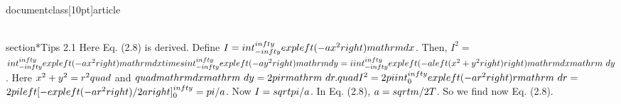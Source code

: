 \\documentclass[10pt]{article}
\begin{document}
\\section*{Tips 2.1}
Here Eq. (2.8) is derived. Define $I=\\int_{-\\infty}^{\\infty} \\exp \\left(-a x^{2}\\right) \\mathrm{d} x$. Then, $I^{2}=$ $\\int_{-\\infty}^{\\infty} \\exp \\left(-a x^{2}\\right) \\mathrm{d} x \\times \\int_{-\\infty}^{\\infty} \\exp \\left(-a y^{2}\\right) \\mathrm{d} y=\\iint_{-\\infty}^{\\infty} \\exp \\left(-a\\left(x^{2}+y^{2}\\right)\\right) \\mathrm{d} x \\mathrm{~d} y$. Here $x^{2}+y^{2}=r^{2} \\quad$ and $\\quad \\mathrm{d} x \\mathrm{~d} y=2 \\pi r \\mathrm{~d} r . \\quad I^{2}=2 \\pi \\int_{0}^{\\infty} \\exp \\left(-a r^{2}\\right) r \\mathrm{~d} r=$ $2 \\pi\\left[-\\exp \\left(-a r^{2}\\right) / 2 a\\right]_{0}^{\\infty}=\\pi / a$. Now $I=\\sqrt{\\pi / a}$. In Eq. (2.8), $a=\\sqrt{m / 2 T}$. So we find now Eq. (2.8).
\end{document}
